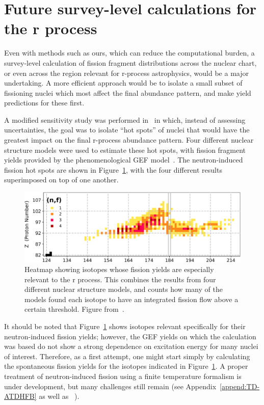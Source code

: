 \section{Future survey-level calculations for the r process}

Even with methods such as ours, which can reduce the computational burden, a survey-level calculation of fission fragment distributions across the nuclear chart, or even across the region relevant for r-process astrophysics, would be a major undertaking. A more efficient approach would be to isolate a small subset of fissioning nuclei which most affect the final abundance pattern, and make yield predictions for these first.

A modified sensitivity study was performed in~\cite{Vassh2019} in which, instead of assessing uncertainties, the goal was to isolate ``hot spots'' of nuclei that would have the greatest impact on the final r-process abundance pattern. Four different nuclear structure models were used to estimate these hot spots, with fission fragment yields provided by the phenomenological GEF model~\cite{Schmidt2016}. The neutron-induced fission hot spots are shown in Figure~\ref{fig:rprocimportant-fissions}, with the four different results superimposed on top of one another.

\begin{figure}
	\centering
	\includegraphics[width=0.7\linewidth]{TeX_files/rProc_important-fissions}
	\caption[Heatmap showing isotopes whose fission yields are especially relevant to the r process. This combines the results from four different nuclear structure models, and counts how many of the models found each isotope to have an integrated fission flow above a certain threshold.]{Heatmap showing isotopes whose fission yields are especially relevant to the r process. This combines the results from four different nuclear structure models, and counts how many of the models found each isotope to have an integrated fission flow above a certain threshold. Figure from~\cite{Vassh2019}.}
	\label{fig:rprocimportant-fissions}
\end{figure}

It should be noted that Figure~\ref{fig:rprocimportant-fissions} shows isotopes relevant specifically for their neutron-induced fission yields; however, the GEF yields on which the calculation was based do not show a strong dependence on excitation energy for many nuclei of interest. Therefore, as a first attempt, one might start simply by calculating the spontaneous fission yields for the isotopes indicated in Figure~\ref{fig:rprocimportant-fissions}. A proper treatment of neutron-induced fission using a finite temperature formalism is under development, but many challenges still remain (see Appendix~\ref{append:TD-ATDHFB} as well as ~\cite{Mcdonnell2014, Schunck2014, Schunck2015b}).

